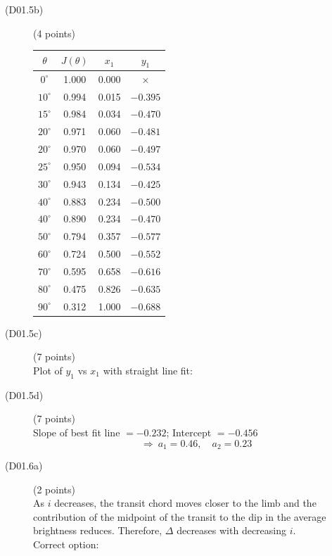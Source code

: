 \begin{description}
\item[(D01.5b)] \hfill(4 points)
\begin{center}
\begin{tabular}{cccc}
\toprule
$\theta$ & $J(\theta)$ & $x_1$ & $y_1$\\
\midrule
$0^\circ$ & 1.000 & 0.000 & $\times$\\
$10^\circ$ & 0.994 & 0.015 & $-0.395$\\
$15^\circ$ & 0.984 & 0.034 & $-0.470$\\
$20^\circ$ & 0.971 & 0.060 & $-0.481$\\
$20^\circ$ & 0.970 & 0.060 & $-0.497$\\
$25^\circ$ & 0.950 & 0.094 & $-0.534$\\
$30^\circ$ & 0.943 & 0.134 & $-0.425$\\
$40^\circ$ & 0.883 & 0.234 & $-0.500$\\
$40^\circ$ & 0.890 & 0.234 & $-0.470$\\
$50^\circ$ & 0.794 & 0.357 & $-0.577$\\
$60^\circ$ & 0.724 & 0.500 & $-0.552$\\
$70^\circ$ & 0.595 & 0.658 & $-0.616$\\
$80^\circ$ & 0.475 & 0.826 & $-0.635$\\
$90^\circ$ & 0.312 & 1.000 & $-0.688$\\
\bottomrule
\end{tabular}
\end{center}

\item[(D01.5c)] \hfill(7 points)\\
Plot of $y_1$ vs $x_1$ with straight line fit:

\item[(D01.5d)] \hfill(7 points)\\
Slope of best fit line $= -0.232$; Intercept $= -0.456$
\[ \boxed{\Longrightarrow\ a_1 = 0.46, \quad a_2 = 0.23} \]

\item[(D01.6a)] \hfill(2 points)\\
As $i$ decreases, the transit chord moves closer to the limb and the
contribution of the midpoint of the transit to the dip in the average
brightness reduces. Therefore, $\Delta$ decreases with decreasing $i$.\\
Correct option: 


\end{description}
